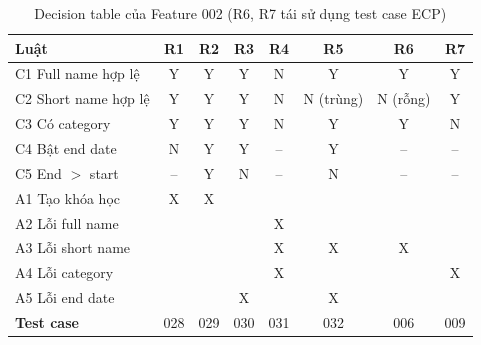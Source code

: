 \begin{table}[H]
\centering\footnotesize
\begin{tabular}{|l|c|c|c|c|c|c|c|}
\hline
\rowcolor{gray!15}\textbf{Luật} & R1 & R2 & R3 & R4 & R5 & R6 & R7 \\ \hline
C1 Full name hợp lệ & Y & Y & Y & N & Y & Y & Y \\ \hline
C2 Short name hợp lệ & Y & Y & Y & N & N (trùng) & N (rỗng) & Y \\ \hline
C3 Có category & Y & Y & Y & N & Y & Y & N \\ \hline
C4 Bật end date & N & Y & Y & -- & Y & -- & -- \\ \hline
C5 End $>$ start & -- & Y & N & -- & N & -- & -- \\ \hline
A1 Tạo khóa học & X & X & & & & & \\ \hline
A2 Lỗi full name & & & & X & & & \\ \hline
A3 Lỗi short name & & & & X & X & X & \\ \hline
A4 Lỗi category & & & & X & & & X \\ \hline
A5 Lỗi end date & & & X & & X & & \\ \hline
\textbf{Test case} & 028 & 029 & 030 & 031 & 032 & 006 & 009 \\ \hline
\end{tabular}
\caption{Decision table của Feature 002 (R6, R7 tái sử dụng test case ECP)}
\end{table}

